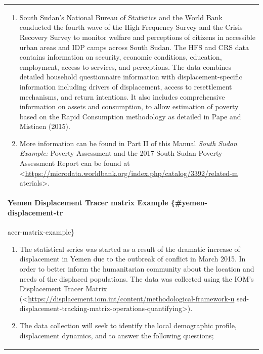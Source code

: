 \documentclass[
]{article}
\begin{document}
\begin{longtable}[]{@{}l@{}}
\toprule
\endhead
\begin{minipage}[t]{0.97\columnwidth}\raggedright
\begin{enumerate}
\def\labelenumi{\arabic{enumi}.}
\setcounter{enumi}{451}
\item
  South Sudan's National Bureau of Statistics and the World Bank
  conducted the fourth wave of the High Frequency Survey and the
  Crisis Recovery Survey to monitor welfare and perceptions of
  citizens in accessible urban areas and IDP camps across South
  Sudan. The HFS and CRS data contains information on security,
  economic conditions, education, employment, access to services,
  and perceptions. The data combines detailed household
  questionnaire information with displacement-specific information
  including drivers of displacement, access to resettlement
  mechanisms, and return intentions. It also includes comprehensive
  information on assets and consumption, to allow estimation of
  poverty based on the Rapid Consumption methodology as detailed in
  Pape and Mistiaen (2015).
\item
  More information can be found in Part II of this Manual \emph{South
  Sudan Example:} Poverty Assessment and the 2017 South Sudan
  Poverty Assessment Report can be found at
  \textless{}\url{https://microdata.worldbank.org/index.php/catalog/3392/related-m}
  aterials\textgreater.
\end{enumerate}

\hypertarget{yemen-displacement-tracer-matrix-example-yemen-displacement-tr}{%
\paragraph{Yemen Displacement Tracer matrix Example \{\#yemen-displacement-tr}\label{yemen-displacement-tracer-matrix-example-yemen-displacement-tr}}

acer-matrix-example\}

\begin{enumerate}
\def\labelenumi{\arabic{enumi}.}
\setcounter{enumi}{453}
\item
  The statistical series was started as a result of the dramatic
  increase of displacement in Yemen due to the outbreak of conflict
  in March 2015. In order to better inform the humanitarian
  community about the location and needs of the displaced
  populations. The data was collected using the IOM's Displacement
  Tracer Matrix
  (\textless{}\url{https://displacement.iom.int/content/methodological-framework-u}
  sed-displacement-tracking-matrix-operations-quantifying\textgreater).
\item
  The data collection will seek to identify the local demographic
  profile, displacement dynamics, and to answer the following
  questions;
\end{enumerate}


\end{minipage}
\end{longtable}
\end{document}

